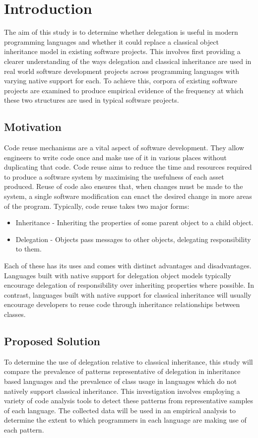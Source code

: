\chapter{Introduction}\label{C:intro}
The aim of this study is to determine whether delegation is useful in modern programming languages and whether it could replace a classical object inheritance model in existing software projects. This involves first providing a clearer understanding of the ways delegation and classical inheritance are used in real world software development projects across programming languages with varying native support for each. To achieve this, corpora of existing software projects are examined to produce empirical evidence of the frequency at which these two structures are used in typical software projects.

\section{Motivation}
Code reuse mechanisms are a vital aspect of software development. They allow engineers to write code once and make use of it in various places without duplicating that code. Code reuse aims to reduce the time and resources required to produce a software system by maximising the usefulness of each asset produced. Reuse of code also ensures that, when changes must be made to the system, a single software modification can enact the desired change in more areas of the program.
\newline
Typically, code reuse takes two major forms:
\begin{itemize}
	\item Inheritance - Inheriting the properties of some parent object to a child object.
	\item Delegation - Objects pass messages to other objects, delegating responsibility to them.
\end{itemize}
Each of these has its uses and comes with distinct advantages and disadvantages. Languages built with native support for delegation object models typically encourage delegation of responsibility over inheriting properties where possible. In contrast, languages built with native support for classical inheritance will usually encourage developers to reuse code through inheritance relationships between classes.

\section{Proposed Solution}
To determine the use of delegation relative to classical inheritance, this study will compare the prevalence of patterns representative of delegation in inheritance based languages and the prevalence of class usage in languages which do not natively support classical inheritance. This investigation involves employing a variety of code analysis tools to detect these patterns from representative samples of each language. The collected data will be used in an empirical analysis to determine the extent to which programmers in each language are making use of each pattern.

